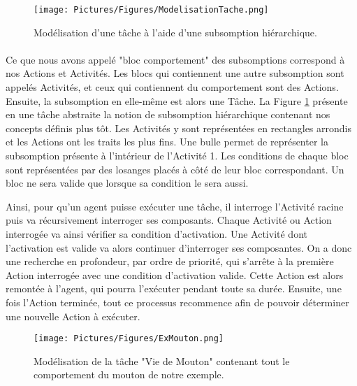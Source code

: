			\begin{figure}
			\centering
			\texttt{[image: Pictures/Figures/ModelisationTache.png]}
			\caption{Modélisation d'une tâche à l'aide d'une subsomption hiérarchique.}
			\label{ModelisationTache}
			\end{figure}
		\paragraph{}
			
			Ce que nous avons appelé "bloc comportement" des subsomptions correspond à nos Actions et Activités. Les blocs qui contiennent une autre subsomption sont appelés Activités, et ceux qui contiennent du comportement sont des Actions. Ensuite, la subsomption en elle-même est alors une Tâche. La Figure \ref{ModelisationTache} présente en une tâche abstraite la notion de subsomption hiérarchique contenant nos concepts définis plus tôt. Les Activités y sont représentées en rectangles arrondis et les Actions ont les traits les plus fins. Une bulle permet de représenter la subsomption présente à l'intérieur de l'Activité 1. Les conditions de chaque bloc sont représentées par des losanges placés à côté de leur bloc correspondant. Un bloc ne sera valide que lorsque sa condition le sera aussi.
			
			Ainsi, pour qu'un agent puisse exécuter une tâche, il interroge l'Activité racine puis va récursivement interroger ses composants. Chaque Activité ou Action interrogée va ainsi vérifier sa condition d'activation. Une Activité dont l'activation est valide va alors continuer d'interroger ses composantes. On a donc une recherche en profondeur, par ordre de priorité, qui s'arrête à la première Action interrogée avec une condition d'activation valide. Cette Action est alors remontée à l'agent, qui pourra l'exécuter pendant toute sa durée. Ensuite, une fois l'Action terminée, tout ce processus recommence afin de pouvoir déterminer une nouvelle Action à exécuter.
			
			\begin{figure}
			\centering
			\texttt{[image: Pictures/Figures/ExMouton.png]}
			\caption{Modélisation de la tâche "Vie de Mouton" contenant tout le comportement du mouton de notre exemple.}
			\label{TacheMouton}
			\end{figure}
			
